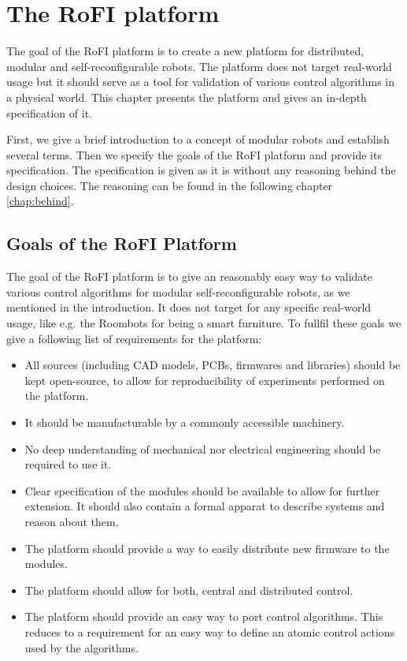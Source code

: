 \chapter{The RoFI platform}\label{chap:rofi}

The goal of the RoFI platform is to create a new platform for distributed,
modular and self-reconfigurable robots. The platform does not target real-world
usage but it should serve as a tool for validation of various control algorithms
in a physical world. This chapter presents the platform and gives an in-depth
specification of it.

First, we give a brief introduction to a concept of modular robots and establish
several terms. Then we specify the goals of the RoFI platform and provide its
specification. The specification is given as it is without any reasoning behind
the design choices. The reasoning can be found in the following chapter
\ref{chap:behind}.


\section{Goals of the RoFI Platform}

The goal of the RoFI platform is to give an reasonably easy way to validate
various control algorithms for modular self-reconfigurable robots, as we
mentioned in the introduction. It does not target for any specific real-world
usage, like e.g. the Roombots\cite{bonardi_locomotion_2012} for being a smart
furniture. To fullfil these goals we give a following list of requirements for
the platform:

\begin{itemize}
    \item All sources (including CAD models, PCBs, firmwares and libraries)
    should be kept open-source, to allow for reproducibility of experiments
    performed on the platform.
    \item It should be manufacturable by a commonly accessible machinery.
    \item No deep understanding of mechanical nor electrical engineering should
    be required to use it.
    \item Clear specification of the modules should be available to allow for
    further extension. It should also contain a formal apparat to describe
    systems and reason about them.
    \item The platform should provide a way to easily distribute new firmware to
    the modules.
    \item The platform should allow for both, central and distributed control.
    \item The platform should provide an easy way to port control algorithms.
    This reduces to a requirement for an easy way to define an atomic control
    actions used by the algorithms.
\end{itemize}

